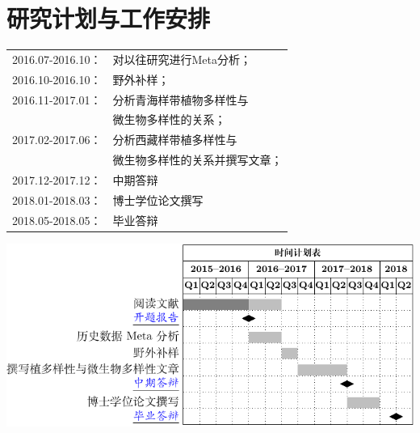 \section{研究计划与工作安排}
\begin{frame}{\insertsection}{\insertsubsection}
\begin{center}
	\begin{tabular}{ l l  }
		2016.07-2016.10： & 对以往研究进行Meta分析；\\ 
		2016.10-2016.10： & 野外补样；\\
		2016.11-2017.01： & 分析青海样带植物多样性与\\
		& 微生物多样性的关系；\\
		2017.02-2017.06： & 分析西藏样带植多样性与\\
		& 微生物多样性的关系并撰写文章；\\  
		2017.12-2017.12： & 中期答辩\\
		2018.01-2018.03： & 博士学位论文撰写\\
		2018.05-2018.05： & 毕业答辩
	\end{tabular}
\end{center}

\end{frame}
\begin{frame}{\insertsection}{\insertsubsection}
	\begin{center}
		\includegraphics[width = \textwidth]{./pic/gatt.pdf}
	\end{center}
\end{frame}



